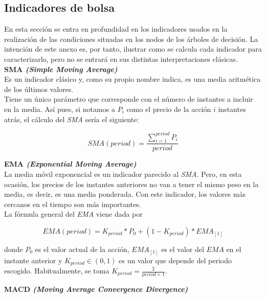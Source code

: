 \begin{appendices}
\chapter{Indicadores de bolsa}\label{apendice}
En esta secci\'on se entra en profundidad en los indicadores usados en la realizaci\'on de las condiciones situadas en los nodos de los \'arboles de decisi\'on. La intenci\'on de este anexo es, por tanto, ilustrar como se calcula cada indicador para caracterizarlo, pero no se entrar\'a en sus distintas interpretaciones cl\'asicas.\\


\noindent\textbf{SMA \textit{(Simple Moving Average)}}\\

Es un indicador cl\'asico y, como su propio nombre indica, es una media aritm\'etica de los \'ultimos valores.\\

Tiene un \'unico par\'ametro que corresponde con el n\'umero de instantes a incluir en la media. As\'i pues, si notamos a $P_i$ como el precio de la acci\'on $i$ instantes atr\'as, el c\'alculo del \textit{SMA} ser\'ia el siguiente:

\[SMA(period) = \frac{\sum\limits_{i=1}^{period}P_i}{period}\]

\vspace{0.5cm}
\noindent\textbf{EMA \textit{(Exponential Moving Average)}}\\

La media m\'ovil exponencial es un indicador parecido al \textit{SMA}. Pero, en esta ocasi\'on, los precios de los instantes anteriores no van a tener el mismo peso en la media, es decir, es una media ponderada. Con este indicador, los valores m\'as cercanos en el tiempo son m\'as importantes.\\

La f\'ormula general del \textit{EMA} viene dada por

\[EMA(period) = K_{period} * P_0 + (1 - K_{period}) * EMA_{[1]}\]

donde $P_0$ es el valor actual de la acci\'on, $EMA_{[1]}$ es el valor del $EMA$ en el instante anterior y $K_{period} \in (0,1)$ es un valor que depende del periodo escogido. Habitualmente, se toma $K_{period} = \frac{2}{period + 1}$. 

\vspace{0.5cm}
\noindent\textbf{MACD \textit{(Moving Average Convergence Divergence)}}\\


\end{appendices}
